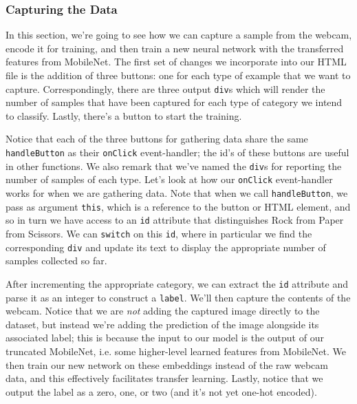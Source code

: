 \documentclass[12pt]{article}
\begin{document}
\subsubsection{Capturing the Data} In this section, we're going to see how we can capture a sample from the webcam, encode it for training, and then train a new neural network with the transferred features from MobileNet. The first set of changes we incorporate into our HTML file is the addition of three buttons: one for each type of example that we want to capture. Correspondingly, there are three output \texttt{div}s which will render the number of samples that have been captured for each type of category we intend to classify. Lastly, there's a button to start the training.

Notice that each of the three buttons for gathering data share the same \texttt{handleButton} as their \texttt{onClick} event-handler; the id's of these buttons are useful in other functions. We also remark that we've named the \texttt{div}s for reporting the number of samples of each type.  Let's look at how our \texttt{onClick} event-handler works for when we are gathering data. Note that when we call \texttt{handleButton}, we pass as argument \texttt{this},
which is a reference to the button or HTML element, and so in turn we have access to an \texttt{id} attribute that distinguishes Rock from Paper from Scissors. We can \texttt{switch} on this \texttt{id}, where in particular we find the corresponding \texttt{div} and update its text to display the appropriate number of samples collected so far.

After incrementing the appropriate category, we can extract the \texttt{id} attribute and parse it as an integer to construct a \texttt{label}. We'll then capture the contents of the webcam. Notice that we are \emph{not} adding the captured image directly to the dataset, but instead we're adding the prediction of the image alongside its associated label; this is because the input to our model is the output of our truncated MobileNet, i.e. some higher-level learned features from MobileNet. We then train our new network on these embeddings instead of the raw webcam data, and this effectively facilitates transfer learning. Lastly, notice that we output the label as a zero, one, or two (and it's not yet one-hot encoded).
\end{document}
